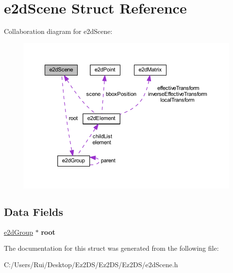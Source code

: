 \hypertarget{structe2d_scene}{\section{e2d\-Scene Struct Reference}
\label{structe2d_scene}
}


Collaboration diagram for e2d\-Scene\-:\nopagebreak
\begin{figure}[H]
\begin{center}
\leavevmode
\includegraphics[width=350pt]{structe2d_scene__coll__graph}
\end{center}
\end{figure}
\subsection*{Data Fields}
\begin{DoxyCompactItemize}
\item 
\hypertarget{structe2d_scene_aa5444ac46bf18449921a4094bcadde1c}{\hyperlink{structe2d_group}{e2d\-Group} $\ast$ {\bfseries root}}\label{structe2d_scene_aa5444ac46bf18449921a4094bcadde1c}

\end{DoxyCompactItemize}


The documentation for this struct was generated from the following file\-:\begin{DoxyCompactItemize}
\item 
C\-:/\-Users/\-Rui/\-Desktop/\-Ez2\-D\-S/\-Ez2\-D\-S/\-Ez2\-D\-S/e2d\-Scene.\-h\end{DoxyCompactItemize}
